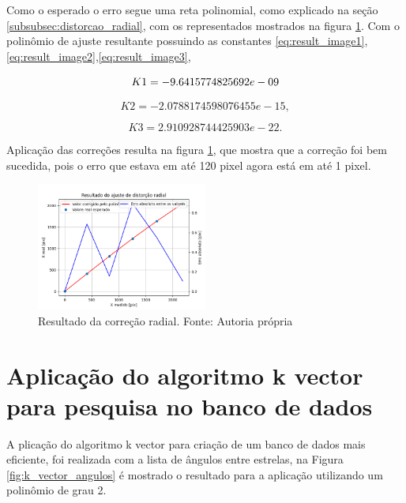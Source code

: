Como o esperado o erro segue uma reta polinomial, como explicado na seção \ref{subsubsec:distorcao_radial}, com os representados mostrados na figura \ref{fig:image_corretion}.
Com o polinômio de ajuste resultante possuindo as constantes \ref{eq:result_image1},\ref{eq:result_image2},\ref{eq:result_image3}, 

\begin{equation}
    K1 = -9.6415774825692e-09\newline
    \label{eq:result_image1}
\end{equation}

\begin{equation}
    K2 = -2.0788174598076455e-15,
    \label{eq:result_image2}
\end{equation}

\begin{equation}
    K3 = 2.910928744425903e-22.
    \label{eq:result_image3}
\end{equation}

Aplicação das correções resulta na figura \ref{fig:image_corretion}, 
que mostra que a correção foi bem sucedida, pois o erro que estava em até 120 pixel agora está em até 1 pixel.

\begin{figure}[H]
    \centering
    \includegraphics[width=0.5\textwidth]{images/image_corretion.png}
    \caption{Resultado da correção radial. Fonte: Autoria própria}
    \label{fig:image_corretion}
\end{figure}

\section{Aplicação do algoritmo k vector para pesquisa no banco de dados}

A plicação do algoritmo k vector para criação de um banco de dados mais eficiente, 
foi realizada com a lista de ângulos entre estrelas, 
na Figura \ref{fig:k_vector_angulos} é mostrado o resultado para a aplicação utilizando um polinômio de grau 2.

